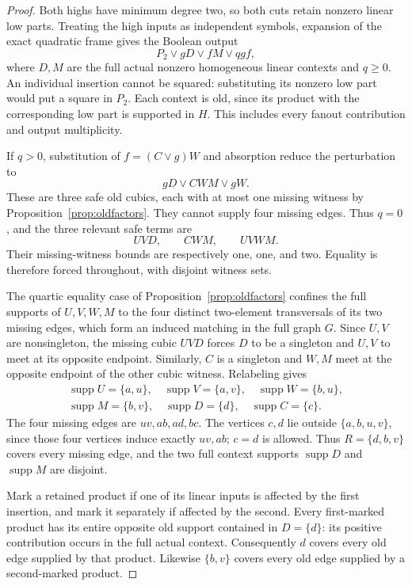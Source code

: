 \documentclass[11pt]{article}
\newcommand{\supp}{\operatorname{supp}}
\theoremstyle{definition}
\theoremstyle{remark}
\begin{document}
\begin{proof}
Both highs have minimum degree two, so both cuts retain nonzero linear low parts. Treating the high inputs as independent symbols, expansion of the exact quadratic frame gives the Boolean output
\[
 P_2\vee gD\vee fM\vee qgf,
\]
where $D,M$ are the full actual nonzero homogeneous linear contexts and $q\ge0$. An individual insertion cannot be squared: substituting its nonzero low part would put a square in $P_2$. Each context is old, since its product with the corresponding low part is supported in $H$. This includes every fanout contribution and output multiplicity.

If $q>0$, substitution of $f=(C\vee g)W$ and absorption reduce the perturbation to
\[
 gD\vee CWM\vee gW.
\]
These are three safe old cubics, each with at most one missing witness by Proposition~\ref{prop:oldfactors}. They cannot supply four missing edges. Thus $q=0$, and the three relevant safe terms are
\[
 UVD,\qquad CWM,\qquad UVWM.
\]
Their missing-witness bounds are respectively one, one, and two. Equality is therefore forced throughout, with disjoint witness sets.

The quartic equality case of Proposition~\ref{prop:oldfactors} confines the full supports of $U,V,W,M$ to the four distinct two-element transversals of its two missing edges, which form an induced matching in the full graph $G$. Since $U,V$ are nonsingleton, the missing cubic $UVD$ forces $D$ to be a singleton and $U,V$ to meet at its opposite endpoint. Similarly, $C$ is a singleton and $W,M$ meet at the opposite endpoint of the other cubic witness. Relabeling gives
\[
 \begin{gathered}
 \supp U=\{a,u\},\quad \supp V=\{a,v\},\quad \supp W=\{b,u\},\\
 \supp M=\{b,v\},\quad \supp D=\{d\},\quad \supp C=\{c\}.
 \end{gathered}
\]
The four missing edges are $uv,ab,ad,bc$. The vertices $c,d$ lie outside $\{a,b,u,v\}$, since those four vertices induce exactly $uv,ab$; $c=d$ is allowed. Thus $R=\{d,b,v\}$ covers every missing edge, and the two full context supports $\supp D$ and $\supp M$ are disjoint.

Mark a retained product if one of its linear inputs is affected by the first insertion, and mark it separately if affected by the second. Every first-marked product has its entire opposite old support contained in $D=\{d\}$: its positive contribution occurs in the full actual context. Consequently $d$ covers every old edge supplied by that product. Likewise $\{b,v\}$ covers every old edge supplied by a second-marked product.


\end{proof}
\end{document}
